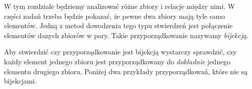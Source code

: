 

\noindent
W tym rozdziale będziemy analizować różne zbiory i relacje między nimi. W części zadań trzeba będzie pokazać, że pewne dwa zbiory mają tyle samo elementów. Jedną z metod dowodzenia tego typu stwierdzeń jest połączenie elementów danych zbiorów w pary. Takie przyporządkowanie nazywamy \textit{bijekcją}.

\begin{center}
\end{center}

\vspace{10px}

\noindent
Aby stwierdzić czy przyporządkowanie jest bijekcją wystarczy sprawdzić, czy każdy element jednego zbioru jest przyporządkowany do \textit{dokładnie} jednego elementu drugiego zbioru. Poniżej dwa przykłady przyporządkowań, które nie są bijekcjami.

